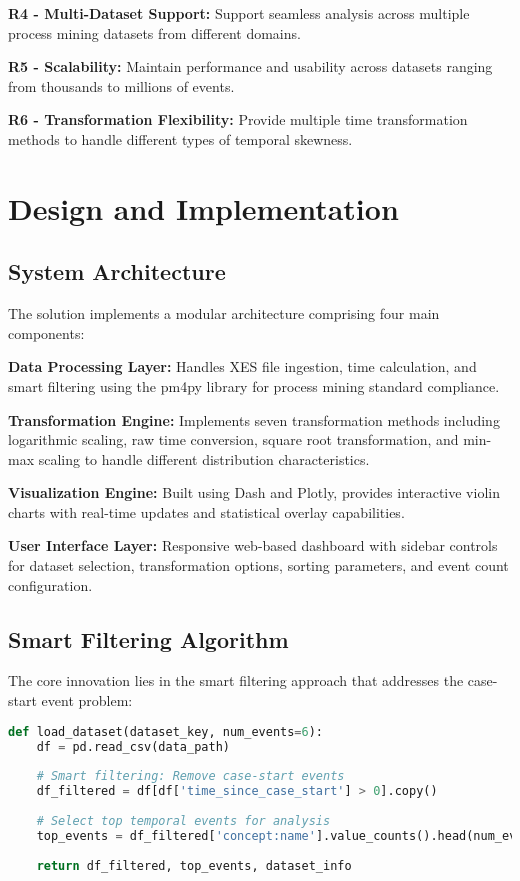 \documentclass[11pt,a4paper]{article}
\begin{document}
\textbf{R4 - Multi-Dataset Support:} Support seamless analysis across multiple process mining datasets from different domains.

\textbf{R5 - Scalability:} Maintain performance and usability across datasets ranging from thousands to millions of events.

\textbf{R6 - Transformation Flexibility:} Provide multiple time transformation methods to handle different types of temporal skewness.

\section{Design and Implementation}
\label{sec:design}

\subsection{System Architecture}

The solution implements a modular architecture comprising four main components:

\textbf{Data Processing Layer:} Handles XES file ingestion, time calculation, and smart filtering using the pm4py library for process mining standard compliance.

\textbf{Transformation Engine:} Implements seven transformation methods including logarithmic scaling, raw time conversion, square root transformation, and min-max scaling to handle different distribution characteristics.

\textbf{Visualization Engine:} Built using Dash and Plotly, provides interactive violin charts with real-time updates and statistical overlay capabilities.

\textbf{User Interface Layer:} Responsive web-based dashboard with sidebar controls for dataset selection, transformation options, sorting parameters, and event count configuration.

\subsection{Smart Filtering Algorithm}

The core innovation lies in the smart filtering approach that addresses the case-start event problem:

\begin{lstlisting}[language=Python, caption=Smart Filtering Implementation]
def load_dataset(dataset_key, num_events=6):
    df = pd.read_csv(data_path)
    
    # Smart filtering: Remove case-start events
    df_filtered = df[df['time_since_case_start'] > 0].copy()
    
    # Select top temporal events for analysis
    top_events = df_filtered['concept:name'].value_counts().head(num_events).index.tolist()
    
    return df_filtered, top_events, dataset_info
\end{lstlisting}
\end{document}
